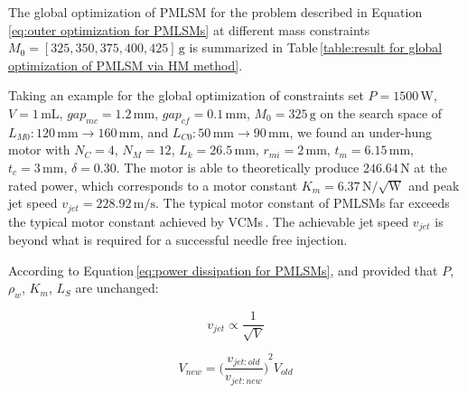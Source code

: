             
        The global optimization of \acs{PMLSM} for the problem described in Equation\,\ref{eq:outer optimization for PMLSMs} at different mass constraints $M_0=[325,350,375,400,425]\,\mathrm{g}$ is summarized in Table\,\ref{table:result for global optimization of PMLSM via HM method}.
            
            
        Taking an example for the global optimization of constraints set $P=1500\,\mathrm{W}$, $V=1\,\mathrm{mL}$, $gap_{mc}=1.2\,\mathrm{mm}$, $gap_{cf}=0.1\,\mathrm{mm}$, $M_0=325\,\mathrm{g}$ on the search space of $L_{M0}:120\,\mathrm{mm}\rightarrow 160\,\mathrm{mm}$, and $L_{C0}:50\,\mathrm{mm}\rightarrow 90\,\mathrm{mm}$, we found an under-hung motor with $N_C=4$, $N_M=12$, $L_k=26.5\,\mathrm{mm}$, $r_{mi}=2\,\mathrm{mm}$, $t_m=6.15\,\mathrm{mm}$, $t_c=3\,\mathrm{mm}$, $\delta=0.30$. The motor is able to theoretically produce $246.64\,\mathrm{N}$ at the rated power, which corresponds to a motor constant $K_m=6.37\,\mathrm{N/\sqrt{W}}$ and peak jet speed $v_{jet}=228.92\,\mathrm{m/s}$. The typical motor constant of \acsp{PMLSM} far exceeds the typical motor constant achieved by \acsp{VCM}\,\cite{ruddy2014}. The achievable jet speed $v_{jet}$ is beyond what is required for a successful needle free injection.
            
            
        According to Equation\,\ref{eq:power dissipation for PMLSMs}, and provided that $P$, $\rho_w$, $K_m$, $L_S$ are unchanged:
            
            
        \begin{equation}
            v_{jet}\propto\frac{1}{\sqrt{V}}
            \label{eq:v_jet and V}
        \end{equation}
            
            
        \begin{equation}
            V_{new}={\bigg(\frac{v_{jet:old}}{v_{jet:new}} \bigg)}^2 V_{old}
            \label{eq:v_jet and V ratio}
        \end{equation}
        
